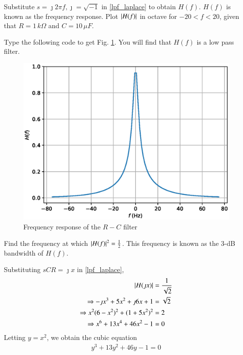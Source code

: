 %
\begin{problem}
Substitute $s = \jmath 2\pi f, \jmath =  \sqrt{-1}$ in \eqref{lpf_laplace} to obtain $H(f)$.  
$H(f)$ is 
known as the frequency response. Plot $\left\vert H(f)\right\vert$ in octave for $-20 < f < 20$, given that $R = 1 \,k\Omega$ and $C = 10 \,\mu F$.
\end{problem}
%
\solution 
%
Type  the following code to get Fig. \ref{fig:filter_plot}.  You will find that $H(f)$ is a low pass
filter.
%

%
\begin{figure}[!h]
\centering
\includegraphics[width=\columnwidth]{chapter2/figs/2.2.eps}
\caption{Frequency response of the $R-C$ filter}
\label{fig:filter_plot}
\end{figure}
\begin{problem}
Find the frequency at which $\left\vert H(f)\right\vert^2 = \frac{1}{2}$. This frequency is
known as the 3-dB bandwidth of $H(f)$.
\end{problem}
%
\solution Substituting $sCR = \jmath x$ in \eqref{lpf_laplace},
%
\begin{align}
 \left\vert H(\jmath x)\right\vert &= \frac{1}{\sqrt{2}} \\
 \Rightarrow 
 -\jmath x^3 + 5x^2 +\jmath 6x + 1 &= \sqrt{2} \\
\Rightarrow 
 x^2(6-x^2)^2 + (1+5x^2)^2 &= 2 \\
 \Rightarrow 
x^6 + 13x^4 + 46x^2 -1&= 0 
\end{align}
%
Letting $y=x^2$, we obtain the cubic equation
%
\begin{align}
y^3 + 13y^2 + 46 y -1 = 0
\end{align}
